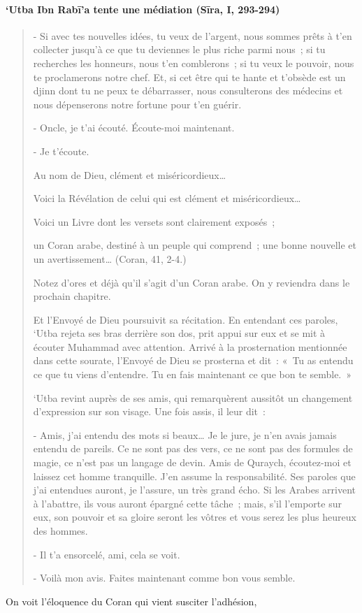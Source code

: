 \paragraph{`Utba Ibn Rabī'a tente une médiation (Sīra, I,
293-294)}
\begin{quote}
    

{- Si avec tes nouvelles idées, tu veux de l'argent, nous sommes
prêts à t'en collecter jusqu'à ce que tu deviennes le plus riche parmi
nous~; si tu recherches les honneurs, nous t'en comblerons~; si tu veux
le pouvoir, nous te proclamerons notre chef. Et, si cet être qui te
hante et t'obsède est un djinn dont tu ne peux te débarrasser, nous
consulterons des médecins et nous dépenserons notre fortune pour t'en
guérir.}

{- Oncle, je t'ai écouté. Écoute-moi maintenant.}

{- Je t'écoute.}

{Au nom de Dieu, clément et miséricordieux\ldots{}}

{Voici la Révélation de celui qui est clément et
miséricordieux\ldots{}}

{Voici un Livre dont les versets sont clairement exposés~;}

{un Coran arabe, destiné à un peuple qui comprend~; une bonne
nouvelle et un avertissement\ldots{} (Coran, 41, 2-4.)}

Notez d'ores et déjà qu'il s'agit d'un Coran arabe. On y reviendra dans
le prochain chapitre.

{Et l'Envoyé de Dieu poursuivit sa récitation. En entendant ces
paroles, `Utba rejeta ses bras derrière son dos, prit appui sur eux et
se mit à écouter Muhammad avec attention. Arrivé à la prosternation
mentionnée dans cette sourate, l'Envoyé de Dieu se prosterna et dit~:
«~Tu as entendu ce que tu viens d'entendre. Tu en fais maintenant ce que
bon te semble.~»}

{`Utba revint auprès de ses amis, qui remarquèrent aussitôt un
changement d'expression sur son visage. Une fois assis, il leur dit~:}

{- Amis, j'ai entendu des mots si beaux\ldots{} Je le jure, je n'en
avais jamais entendu de pareils. Ce ne sont pas des vers, ce ne sont pas
des formules de magie, ce n'est pas un langage de devin. Amis de
Quraych, écoutez-moi et laissez cet homme tranquille. J'en assume la
responsabilité. Ses paroles que j'ai entendues auront, je l'assure, un
très grand écho. Si les Arabes arrivent à l'abattre, ils vous auront
épargné cette tâche~; mais, s'il l'emporte sur eux, son pouvoir et sa
gloire seront les vôtres et vous serez les plus heureux des hommes.}

{- Il t'a ensorcelé, ami, cela se voit.}

{- Voilà mon avis. Faites maintenant comme bon vous semble.}
\end{quote}
On voit l'éloquence du Coran qui vient susciter l'adhésion,

